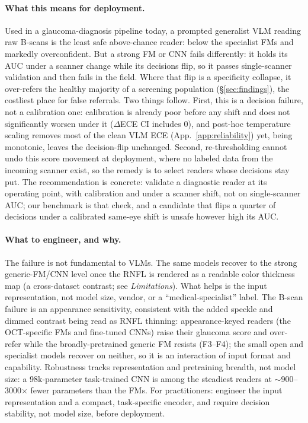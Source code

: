 \paragraph{What this means for deployment.} Used in a glaucoma-diagnosis pipeline today, a prompted generalist
VLM reading raw B-scans is the least safe above-chance reader: below the specialist FMs and markedly overconfident. But a strong FM or CNN fails differently: it holds its AUC under a
scanner change while its decisions flip, so it passes single-scanner validation and then fails in the field. Where that flip is a specificity collapse, it over-refers the healthy
majority of a screening population (\S\ref{sec:findings}), the costliest place for false referrals. Two things follow. First, this is a decision failure,
not a calibration one: calibration is already poor before any shift and does not significantly worsen under it
($\Delta$ECE CI includes 0), and post-hoc temperature scaling \citep{guo2017calibration} removes most of the clean VLM
ECE (App.~\ref{app:reliability}) yet, being monotonic, leaves the decision-flip unchanged. Second, re-thresholding cannot undo this score movement at
deployment, where no labeled data from the incoming scanner exist, so the remedy is to select readers whose decisions
stay put. The recommendation is concrete: validate a diagnostic reader at its operating point, with calibration and
under a scanner shift, not on single-scanner AUC; our benchmark is that check, and a candidate that flips a quarter of
decisions under a calibrated same-eye shift is unsafe however high its AUC.

\paragraph{What to engineer, and why.} The failure is not fundamental to VLMs. The same models recover to the strong
generic-FM/CNN level once the RNFL is rendered as a readable color thickness map (a cross-dataset contrast; see
\emph{Limitations}). What helps is the input
representation, not model size, vendor, or a ``medical-specialist'' label. The B-scan failure is an appearance
sensitivity, consistent with the added speckle and dimmed contrast being read as RNFL thinning: appearance-keyed readers
(the OCT-specific FMs and fine-tuned CNNs) raise their glaucoma score and over-refer while the broadly-pretrained
generic FM resists (F3--F4); the small open and specialist models recover on neither, so it is an interaction of input format and
capability. Robustness tracks representation and pretraining breadth, not model size: a 98k-parameter task-trained CNN is among
the steadiest readers at $\sim$900--3000$\times$ fewer parameters than the FMs. For practitioners: engineer the input
representation and a compact, task-specific encoder, and require decision stability, not model size, before deployment.

